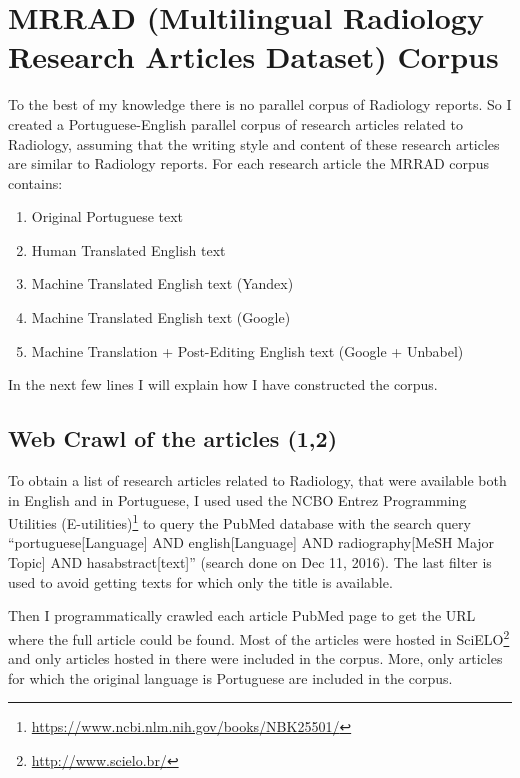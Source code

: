 \label{chap3}

\section{MRRAD (Multilingual Radiology Research Articles Dataset) Corpus}

To the best of my knowledge there is no parallel corpus of Radiology reports. So I created a Portuguese-English parallel corpus of research articles related to Radiology, assuming that the writing style and content of these research articles are similar to Radiology reports. For each research article the MRRAD corpus contains:

\begin{enumerate}
\item Original Portuguese text
\item Human Translated English text
\item Machine Translated English text (Yandex) 
\item Machine Translated English text (Google) 
\item Machine Translation + Post-Editing English text (Google + Unbabel) 
\end{enumerate}

\noindent In the next few lines I will explain how I have constructed the corpus. 

\subsection{Web Crawl of the articles (1,2)}

To obtain a list of research articles related to Radiology, that were available both in English and in Portuguese, I used used the  NCBO Entrez Programming Utilities (E-utilities)\footnote{\url{https://www.ncbi.nlm.nih.gov/books/NBK25501/}} to query the PubMed database with the search query “portuguese[Language] AND english[Language] AND radiography[MeSH Major Topic] AND hasabstract[text]” (search done on Dec 11, 2016). The last filter is used to avoid getting texts for which only the title is available. 

Then I programmatically crawled each article PubMed page to get the URL where the full article could be found. Most of the articles were hosted in SciELO\footnote{\url{http://www.scielo.br/}} and only articles hosted in there were included in the corpus. More, only articles for which the original language is Portuguese are included in the corpus. 

